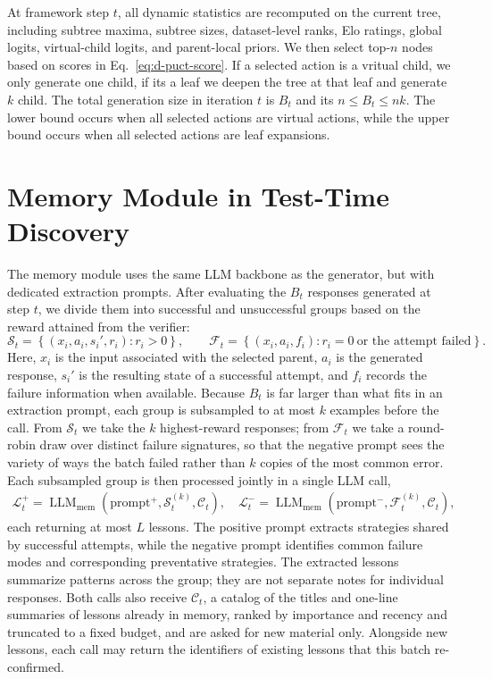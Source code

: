 \documentclass{article} %
\begin{document}
At framework step $t$, all dynamic statistics are recomputed on the current
tree, including subtree maxima, subtree sizes, dataset-level ranks, Elo ratings,
global logits, virtual-child logits, and parent-local priors. We then select top-$n$ nodes based on scores in Eq.~\eqref{eq:d-puct-score}. If a selected action is a vritual child, we only generate one child, if its a leaf we deepen the tree at that leaf and generate $k$ child. 
The total generation size in iteration $t$ is
$B_t$ and its $n\leq B_t\leq nk.$
The lower bound occurs when all selected actions are virtual actions, while the
upper bound occurs when all selected actions are leaf expansions.




\section{Memory Module in Test-Time Discovery}
\label{sec:memory}

The memory module uses the same LLM backbone as the generator, but with dedicated
extraction prompts. After evaluating the $B_t$ responses generated at step $t$, we divide
them into successful and unsuccessful groups based on the reward attained from the
verifier:
\begin{equation*}
\mathcal{S}_t
=
\left\{
(x_i,a_i,s_i',r_i): r_i>0
\right\},
\qquad
\mathcal{F}_t
=
\left\{
(x_i,a_i,f_i): r_i=0
\ \text{or the attempt failed}
\right\}.
\label{eq:memory-groups}
\end{equation*}
Here, $x_i$ is the input associated with the selected parent, $a_i$ is the generated
response, $s_i'$ is the resulting state of a successful attempt, and $f_i$ records the
failure information when available. Because $B_t$ is far larger than what fits in an
extraction prompt, each group is subsampled to at most $k$ examples before the call. From
$\mathcal{S}_t$ we take the $k$ highest-reward responses; from $\mathcal{F}_t$ we take a
round-robin draw over distinct failure signatures, so that the negative prompt sees the
variety of ways the batch failed rather than $k$ copies of the most common error. Each
subsampled group is then processed jointly in a single LLM call,
\begin{align*}
\mathcal{L}_t^{+}
=
\operatorname{LLM}_{\mathrm{mem}}
\left(
\mathrm{prompt}^{+},
\mathcal{S}_t^{(k)},
\mathcal{C}_t
\right),
\quad
\mathcal{L}_t^{-}
=
\operatorname{LLM}_{\mathrm{mem}}
\left(
\mathrm{prompt}^{-},
\mathcal{F}_t^{(k)},
\mathcal{C}_t
\right),
\end{align*}
each returning at most $L$ lessons. The positive prompt extracts strategies shared by
successful attempts, while the negative prompt identifies common failure modes and
corresponding preventative strategies. The extracted lessons summarize patterns across the
group; they are not separate notes for individual responses. Both calls also receive
$\mathcal{C}_t$, a catalog of the titles and one-line summaries of lessons already in
memory, ranked by importance and recency and truncated to a fixed budget, and are asked for
new material only. Alongside new lessons, each call may return the identifiers of existing
lessons that this batch re-confirmed.
\end{document}
